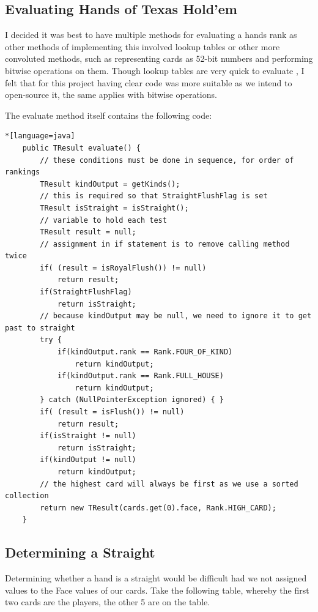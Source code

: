 \documentclass[11pt]{article}
\begin{document}
\newpage
\subsection{Evaluating Hands of Texas Hold'em}

I decided it was best to have multiple methods for evaluating a hands rank as other methods of implementing this involved lookup tables or other more convoluted methods, such as representing cards as 52-bit numbers and performing bitwise operations on them. Though lookup tables are very quick to evaluate \cite{lookup}, I felt that for this project having clear code was more suitable as we intend to open-source it, the same applies with bitwise operations. 

The evaluate method itself contains the following code: 

\begin{lstlisting}*[language=java]
    public TResult evaluate() {
        // these conditions must be done in sequence, for order of rankings
        TResult kindOutput = getKinds();
        // this is required so that StraightFlushFlag is set
        TResult isStraight = isStraight();
        // variable to hold each test
        TResult result = null;
        // assignment in if statement is to remove calling method twice
        if( (result = isRoyalFlush()) != null)
            return result;
        if(StraightFlushFlag)
            return isStraight;
        // because kindOutput may be null, we need to ignore it to get past to straight
        try {
            if(kindOutput.rank == Rank.FOUR_OF_KIND)
                return kindOutput;
            if(kindOutput.rank == Rank.FULL_HOUSE)
                return kindOutput;
        } catch (NullPointerException ignored) { }
        if( (result = isFlush()) != null)
            return result;
        if(isStraight != null)
            return isStraight;
        if(kindOutput != null)
            return kindOutput;
        // the highest card will always be first as we use a sorted collection
        return new TResult(cards.get(0).face, Rank.HIGH_CARD);
    }
\end{lstlisting}


\newpage
\subsection{Determining a Straight}
Determining whether a hand is a straight would be difficult had we not assigned values to the Face values of our cards. Take the following table, whereby the first two cards are the players, the other 5 are on the table. \\
\end{document}
